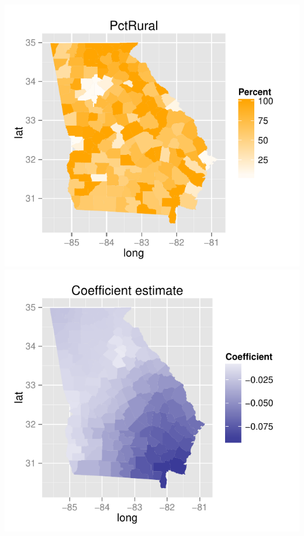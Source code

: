 \begin{widefigure}
\begin{adjustbox}{max width=0.9\paperwidth}
\includegraphics{figure/PctRural.pdf}
\includegraphics{figure/coef.pdf}

\end{adjustbox}
\end{widefigure}
